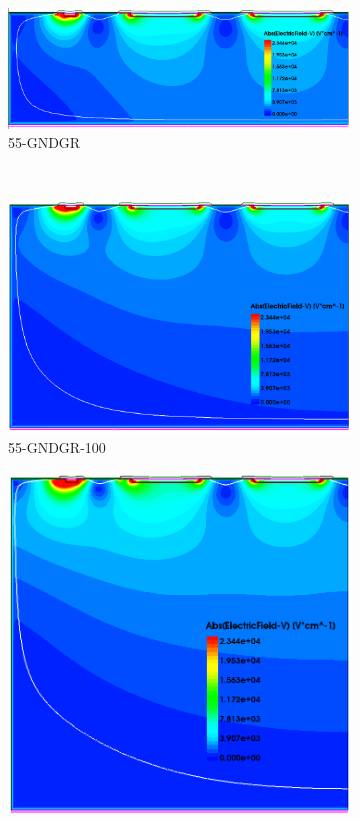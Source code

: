 \begin{figure}[htbp]
\begin{subfigure}[b]{0.5\linewidth}
    \includegraphics[width=\textwidth]{figures/ActiveEdge/Efield_55_GNDGR.png}
    \caption{55-GNDGR}
  \end{subfigure} \\
  \begin{subfigure}[b]{0.5\linewidth}
    \includegraphics[width=\textwidth]{figures/ActiveEdge/Efield_55_GNDGR_100.png}
    \caption{55-GNDGR-100}
  \end{subfigure}\hfill
  \begin{subfigure}[b]{0.5\linewidth}
    \includegraphics[width=\textwidth]{figures/ActiveEdge/Efield_55_GNDGR_150.png}

\end{subfigure}
\end{figure}
